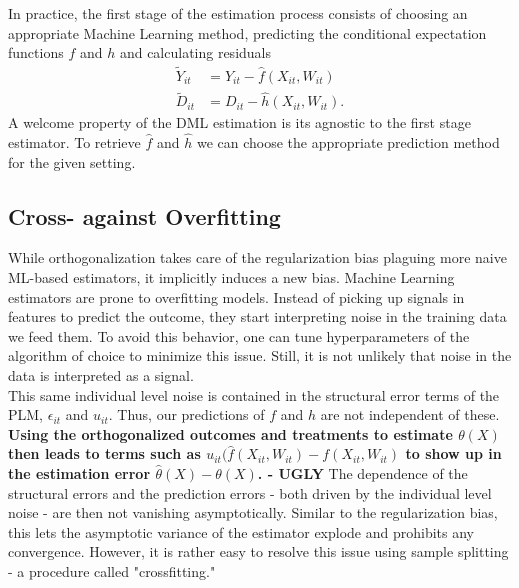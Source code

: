 In practice, the first stage of the estimation process consists of choosing an appropriate Machine Learning method, predicting the conditional expectation functions $f$ and $h$ and calculating residuals 
\begin{align*} 
    \tilde{Y}_{it}&=Y_{it}-\hat{f}(X_{it}, W_{it}) \\ 
    \tilde{D}_{it}&=D_{it}-\hat{h}(X_{it}, W_{it}).
\end{align*}
A welcome property of the DML estimation is its agnostic to the first stage estimator. To retrieve $\hat{f}$ and $\hat{h}$ we can choose the appropriate prediction method for the given setting. 

\subsection{Cross- against Overfitting} \label{sec:cross-fitting}
While orthogonalization takes care of the regularization bias plaguing more naive ML-based estimators, it implicitly induces a new bias. Machine Learning estimators are prone to overfitting models. Instead of picking up signals in features to predict the outcome, they start interpreting noise in the training data we feed them. To avoid this behavior, one can tune hyperparameters of the algorithm of choice to minimize this issue. Still, it is not unlikely that noise in the data is interpreted as a signal. \\
This same individual level noise is contained in the structural error terms of the PLM, $\epsilon_{it}$ and $u_{it}$. Thus, our predictions of $f$ and $h$ are not independent of these. \textbf{Using the orthogonalized outcomes and treatments to estimate $\theta(X)$ then leads to terms such as $u_{it}(\hat{f}(X_{it}, W_{it}) - f(X_{it}, W_{it})$ to show up in the estimation error $\hat{\theta}(X) - \theta(X)$. - UGLY} The dependence of the structural errors and the prediction errors - both driven by the individual level noise - are then not vanishing asymptotically. Similar to the regularization bias, this lets the asymptotic variance of the estimator explode and prohibits any convergence. However, it is rather easy to resolve this issue using sample splitting - a procedure called "crossfitting." \\ 
